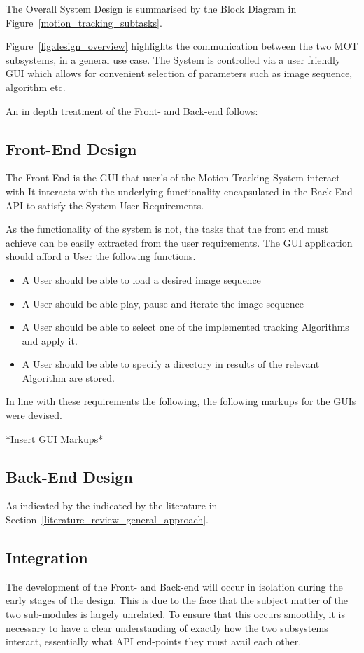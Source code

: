 The Overall System Design is summarised by the Block Diagram in Figure~\ref{motion_tracking_subtasks}.

Figure~\ref{fig:design_overview} highlights the communication between the two MOT
subsystems, in a general use case. The System is controlled via a user
friendly GUI which allows for convenient selection of parameters such as
image sequence, algorithm etc.

An in depth treatment of the Front- and Back-end follows:

\subsection{Front-End Design}
The Front-End is the GUI that user's of the Motion Tracking System interact with 
It interacts with the underlying functionality encapsulated in the Back-End API to
satisfy the System User Requirements. 

As the functionality of the system is not, the tasks that the front
end must achieve can be easily extracted from the user requirements. The GUI
application should afford a User the following functions.
\begin{itemize}
    \item A User should be able to load a desired image sequence
    \item A User should be able play, pause and iterate the image sequence 
    \item A User should be able to select one of the implemented tracking
        Algorithms and apply it.
    \item A User should be able to specify a directory in results of the
        relevant Algorithm are stored.
\end{itemize}

In line with these requirements the following, the following markups for the
GUIs were devised.

*Insert GUI Markups* 

\subsection{Back-End Design}
As indicated by the indicated by the literature in
Section~\ref{literature_review_general_approach}. 

\subsection{Integration}
The development of the Front- and Back-end will occur in isolation during the
early stages of the design. This is due to the face that the subject matter of
the two sub-modules is largely unrelated.  To ensure that this occurs smoothly,
it is necessary to have a clear understanding of exactly how the two subsystems
interact, essentially what API end-points they must avail each other.

